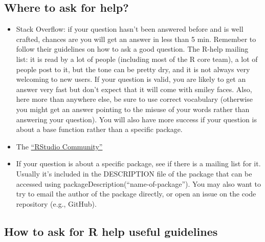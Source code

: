 \documentclass[
]{book}
\providecommand{\tightlist}{%
  \setlength{\itemsep}{0pt}\setlength{\parskip}{0pt}}
\begin{document}
\subsection*{Where to ask for help?}\label{where-to-ask-for-help}

\begin{itemize}
\tightlist
\item
  Stack Overflow: if your question hasn't been answered before and is well crafted, chances are you will get an answer in less than 5 min. Remember to follow their guidelines on how to ask a good question.
  The R-help mailing list: it is read by a lot of people (including most of the R core team), a lot of people post to it, but the tone can be pretty dry, and it is not always very welcoming to new users. If your question is valid, you are likely to get an answer very fast but don't expect that it will come with smiley faces. Also, here more than anywhere else, be sure to use correct vocabulary (otherwise you might get an answer pointing to the misuse of your words rather than answering your question). You will also have more success if your question is about a base function rather than a specific package.
\item
  The \href{https://community.rstudio.com/}{``RStudio Community''}
\item
  If your question is about a specific package, see if there is a mailing list for it. Usually it's included in the DESCRIPTION file of the package that can be accessed using packageDescription(``name-of-package''). You may also want to try to email the author of the package directly, or open an issue on the code repository (e.g., GitHub).
\end{itemize}

\subsection*{How to ask for R help useful guidelines}\label{how-to-ask-for-r-help-useful-guidelines}
\end{document}
